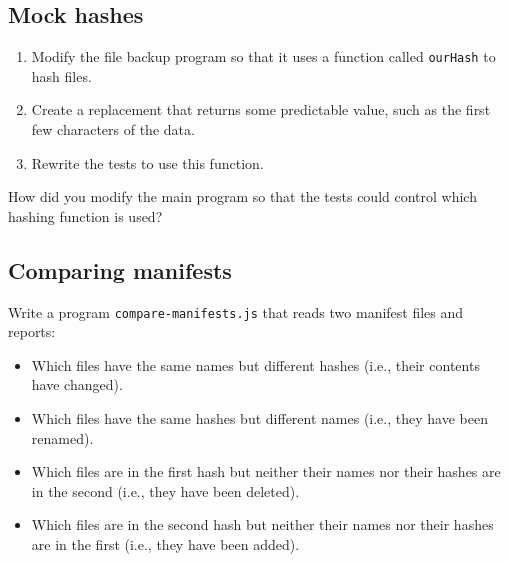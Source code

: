 \documentclass[krantzl]{krantz}
\begin{document}
\subsection*{Mock hashes}

\begin{enumerate}

\item 

Modify the file backup program so that it uses a function called \texttt{ourHash} to hash files.



\item 

Create a replacement that returns some predictable value, such as the first few characters of the data.



\item 

Rewrite the tests to use this function.



\end{enumerate}


\noindent How did you modify the main program so that the tests could control which hashing function is used?

\subsection*{Comparing manifests}


Write a program \texttt{compare-manifests.js} that reads two manifest files and reports:

\begin{itemize}

\item 

Which files have the same names but different hashes
    (i.e., their contents have changed).



\item 

Which files have the same hashes but different names
    (i.e., they have been renamed).



\item 

Which files are in the first hash but neither their names nor their hashes are in the second
    (i.e., they have been deleted).



\item 

Which files are in the second hash but neither their names nor their hashes are in the first
    (i.e., they have been added).



\end{itemize}
\end{document}

